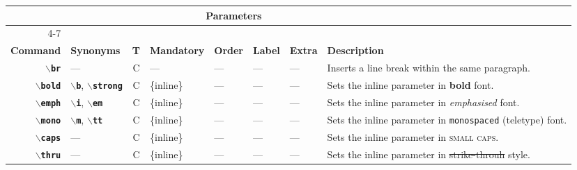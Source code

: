\documentclass[10pt]{article}
\begin{document}
\newcommand{\no}[0]{\textcolor{no}{---}}
\newcommand{\opt}[0]{\textcolor{opt}{opt}}
\newcommand{\dep}[0]{\textcolor{dep}{dep\textsuperscript{1}}}
\newcommand{\depz}[0]{\textcolor{dep}{dep\textsuperscript{2}}}

\newcommand{\C}[0]{\textcolor{composition}{C}}
\newcommand{\M}[0]{\textcolor{manuscript}{M}}

\newcommand{\op}[1]{\textbf{#1}}
\newcommand{\hd}[1]{\textbf{#1}}
\newcommand{\simc}[1]{\textcolor{composition}{\texttt{\bfseries$\backslash$#1}}}
\newcommand{\simm}[1]{\textcolor{manuscript}{\texttt{\bfseries$\backslash$#1}}}
\newcommand{\envc}[1]{\textcolor{composition}{\texttt{\bfseries#1}}}
\newcommand{\envm}[1]{\textcolor{manuscript}{\texttt{\bfseries#1}}}
\newcommand{\textsubscript}[1]{\ensuremath{_{\textrm{#1}}}}

\begin{tabular}{rlcllllp{30em}}

\toprule

			&				&	& \multicolumn{4}{c}{\hd{Parameters}} & \\

\cmidrule{4-7}\\

\hd{Command}		& \hd{Synonyms}			& \hd{T}& \hd{Mandatory}		& \hd{Order}	& \hd{Label}	& \hd{Extra}
& \hd{Description}\\

\midrule

\simc{br}		& \no				& \C	& \no				& \no		& \no		& \no
& Inserts a line break within the same paragraph.\\

\simc{bold}		& \simc{b}, \simc{strong}	& \C	& \{inline\}			& \no		& \no		& \no
& Sets the inline parameter in \textbf{bold} font.\\

\simc{emph}		& \simc{i}, \simc{em}		& \C	& \{inline\}			& \no		& \no		& \no
& Sets the inline parameter in \emph{emphasised} font.\\

\simc{mono}		& \simc{m}, \simc{tt}		& \C	& \{inline\}			& \no		& \no		& \no
& Sets the inline parameter in \texttt{monospaced} (teletype) font.\\

\simc{caps}		& \no				& \C	& \{inline\}			& \no		& \no		& \no
& Sets the inline parameter in \textsc{small caps}.\\

\simc{thru}		& \no				& \C	& \{inline\}			& \no		& \no		& \no
& Sets the inline parameter in \st{strike-throuh} style.\\


\end{tabular}
\end{document}

